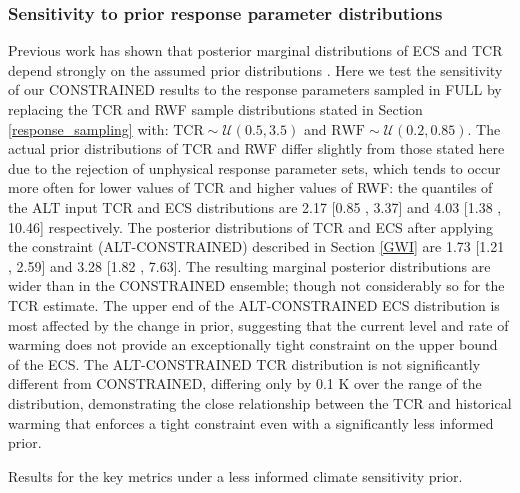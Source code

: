 \documentclass[gmd, manuscript]{copernicus}
\begin{document}
\subsubsection{Sensitivity to prior response parameter distributions}
Previous work has shown that posterior marginal distributions of ECS and TCR depend strongly on the assumed prior distributions \citep{Bodman2016}. Here we test the sensitivity of our CONSTRAINED results to the response parameters sampled in FULL by replacing the TCR and RWF sample distributions stated in Section \ref{response_sampling} with: $\mathrm{TCR}\sim\mathcal{U}\left(0.5,3.5\right)$ and $\mathrm{RWF}\sim\mathcal{U}\left(0.2,0.85\right)$. The actual prior distributions of TCR and RWF differ slightly from those stated here due to the rejection of unphysical response parameter sets, which tends to occur more often for lower values of TCR and higher values of RWF: the quantiles of the ALT input TCR and ECS distributions are 2.17 [0.85 , 3.37] and 4.03 [1.38 , 10.46] respectively. The posterior distributions of TCR and ECS after applying the constraint (ALT-CONSTRAINED) described in Section \ref{GWI} are 1.73 [1.21 , 2.59] and 3.28 [1.82 , 7.63]. The resulting marginal posterior distributions are wider than in the CONSTRAINED ensemble; though not considerably so for the TCR estimate. The upper end of the ALT-CONSTRAINED ECS distribution is most affected by the change in prior, suggesting that the current level and rate of warming does not provide an exceptionally tight constraint on the upper bound of the ECS. The ALT-CONSTRAINED TCR distribution is not significantly different from CONSTRAINED, differing only by 0.1 K over the range of the distribution, demonstrating the close relationship between the TCR and historical warming \citep{Sanderson2020a} that enforces a tight constraint even with a significantly less informed prior.
\begin{table}[h]
    \caption{Results for the key metrics under a less informed climate sensitivity prior.}
    \label{table:alt_results}
    {\footnotesize
    
    }
\end{table}
\clearpage
\end{document}
